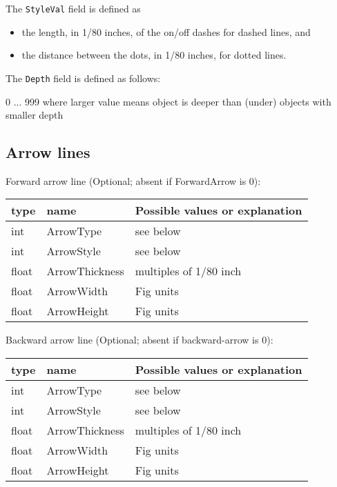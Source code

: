 \documentclass[10pt, a4paper]{article}
\begin{document}
\noindent
The {\tt StyleVal} field is defined as 
%
\begin{itemize}
\item
the length, in 1/80 inches, of the on/off dashes for dashed lines, and 
\item
the distance between the dots, in 1/80 inches, for dotted lines.
\end{itemize}

\noindent
The {\tt Depth} field is defined as follows:

         0 ... 999 where larger value means object is deeper than (under)
                   objects with smaller depth

\subsection{Arrow lines}\label{subsec:paramArrowLines}

Forward arrow line (Optional; absent if ForwardArrow is 0): \\
%
\begin{tabular}{|lll|}
\hline
type & name & Possible values or explanation \\
\hline
\hline
int    & ArrowType      & see below \\
int    & ArrowStyle     & see below \\
float  & ArrowThickness & multiples of 1/80 inch \\
float  & ArrowWidth     & Fig units \\
float  & ArrowHeight    & Fig units \\
\hline
\end{tabular}

Backward arrow line (Optional; absent if backward-arrow is 0): \\
%
\begin{tabular}{|lll|}
\hline
type & name & Possible values or explanation \\
\hline
\hline
int    & ArrowType      & see below \\
int    & ArrowStyle     & see below \\
float  & ArrowThickness & multiples of 1/80 inch \\
float  & ArrowWidth     & Fig units \\
float  & ArrowHeight    & Fig units \\
\hline
\end{tabular}
\end{document}
